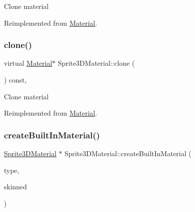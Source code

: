 Clone material 

Reimplemented from \hyperlink{classMaterial_a9e04c5c84a42e10e267157125106104f}{Material}.

\mbox{\label{classSprite3DMaterial_a2ce762d8a3abe91eb5abe2df95aa63f4}} 
\subsubsection{\texorpdfstring{clone()}{clone()}\hspace{0.1cm}{\footnotesize\ttfamily [2/2]}}
{\footnotesize\ttfamily virtual \hyperlink{classMaterial}{Material}$\ast$ Sprite3\+D\+Material\+::clone (\begin{DoxyParamCaption}{ }\end{DoxyParamCaption}) const\hspace{0.3cm}{\ttfamily [override]}, {\ttfamily [virtual]}}

Clone material 

Reimplemented from \hyperlink{classMaterial_a9e04c5c84a42e10e267157125106104f}{Material}.

\mbox{\label{classSprite3DMaterial_a94d990d2049002b37830a4308753ebc0}} 
\subsubsection{\texorpdfstring{create\+Built\+In\+Material()}{createBuiltInMaterial()}\hspace{0.1cm}{\footnotesize\ttfamily [1/4]}}
{\footnotesize\ttfamily \hyperlink{classSprite3DMaterial}{Sprite3\+D\+Material} $\ast$ Sprite3\+D\+Material\+::create\+Built\+In\+Material (\begin{DoxyParamCaption}\item[{\hyperlink{classSprite3DMaterial_a2b3cb11be78a5f6332cc01d5b7063e32}{Material\+Type}}]{type,  }\item[{bool}]{skinned }\end{DoxyParamCaption})\hspace{0.3cm}{\ttfamily [static]}}

